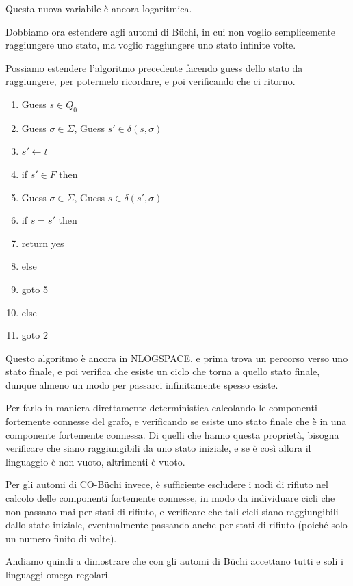 Questa nuova variabile è ancora logaritmica.

Dobbiamo ora estendere agli automi di Büchi, in cui non voglio semplicemente raggiungere uno stato, ma voglio raggiungere uno stato infinite volte.

Possiamo estendere l'algoritmo precedente facendo guess dello stato da raggiungere, per potermelo ricordare, e poi verificando che ci ritorno.

\begin{enumerate}
  \item Guess \(s \in Q_0\)
  \item Guess \(\sigma \in \Sigma\), Guess \(s' \in \delta(s,\sigma)\)
  \item \(s'\gets t\)
  \item if \(s' \in F\) then
  \item   Guess \(\sigma \in \Sigma\), Guess \(s \in \delta(s',\sigma)\)
  \item   if \(s = s'\) then
  \item     return yes
  \item   else
  \item     goto 5
  \item else
  \item  goto 2
\end{enumerate}

Questo algoritmo è ancora in NLOGSPACE\@, e prima trova un percorso verso uno stato finale, e poi verifica che esiste un ciclo che torna a quello stato finale, dunque almeno un modo per passarci infinitamente spesso esiste.

Per farlo in maniera direttamente deterministica calcolando le componenti fortemente connesse del grafo, e verificando se esiste uno stato finale che è in una componente fortemente connessa. Di quelli che hanno questa proprietà, bisogna verificare che siano raggiungibili da uno stato iniziale, e se è così allora il linguaggio è non vuoto, altrimenti è vuoto.

Per gli automi di CO-Büchi invece, è sufficiente escludere i nodi di rifiuto nel calcolo delle componenti fortemente connesse, in modo da individuare cicli che non passano mai per stati di rifiuto, e verificare che tali cicli siano raggiungibili dallo stato iniziale, eventualmente passando anche per stati di rifiuto (poiché solo un numero finito di volte).

Andiamo quindi a dimostrare che con gli automi di Büchi accettano tutti e soli i linguaggi omega-regolari.

